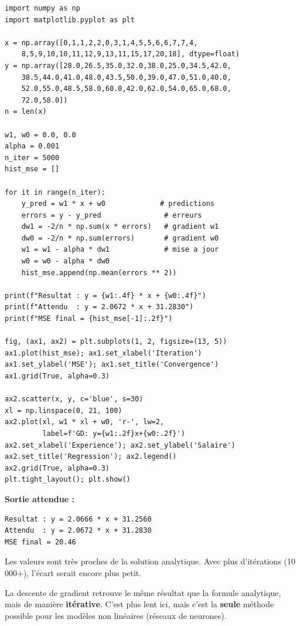 \begin{pythonbox}
\begin{lstlisting}
import numpy as np
import matplotlib.pyplot as plt

x = np.array([0,1,1,2,2,0,3,1,4,5,5,6,6,7,7,4,
    8,5,9,10,10,11,12,9,13,11,15,17,20,18], dtype=float)
y = np.array([28.0,26.5,35.0,32.0,38.0,25.0,34.5,42.0,
    38.5,44.0,41.0,48.0,43.5,50.0,39.0,47.0,51.0,40.0,
    52.0,55.0,48.5,58.0,60.0,42.0,62.0,54.0,65.0,68.0,
    72.0,58.0])
n = len(x)

w1, w0 = 0.0, 0.0
alpha = 0.001
n_iter = 5000
hist_mse = []

for it in range(n_iter):
    y_pred = w1 * x + w0             # predictions
    errors = y - y_pred               # erreurs
    dw1 = -2/n * np.sum(x * errors)   # gradient w1
    dw0 = -2/n * np.sum(errors)       # gradient w0
    w1 = w1 - alpha * dw1             # mise a jour
    w0 = w0 - alpha * dw0
    hist_mse.append(np.mean(errors ** 2))

print(f"Resultat : y = {w1:.4f} * x + {w0:.4f}")
print(f"Attendu  : y = 2.0672 * x + 31.2830")
print(f"MSE final = {hist_mse[-1]:.2f}")

fig, (ax1, ax2) = plt.subplots(1, 2, figsize=(13, 5))
ax1.plot(hist_mse); ax1.set_xlabel('Iteration')
ax1.set_ylabel('MSE'); ax1.set_title('Convergence')
ax1.grid(True, alpha=0.3)

ax2.scatter(x, y, c='blue', s=30)
xl = np.linspace(0, 21, 100)
ax2.plot(xl, w1 * xl + w0, 'r-', lw=2,
         label=f'GD: y={w1:.2f}x+{w0:.2f}')
ax2.set_xlabel('Experience'); ax2.set_ylabel('Salaire')
ax2.set_title('Regression'); ax2.legend()
ax2.grid(True, alpha=0.3)
plt.tight_layout(); plt.show()
\end{lstlisting}
\end{pythonbox}

\textbf{Sortie attendue :}
\begin{verbatim}
Resultat : y = 2.0666 * x + 31.2560
Attendu  : y = 2.0672 * x + 31.2830
MSE final = 20.46
\end{verbatim}

Les valeurs sont tr\`{e}s proches de la solution analytique. Avec plus d'it\'{e}rations (10\,000+), l'\'{e}cart serait encore plus petit.

\begin{retenirbox}
    La descente de gradient retrouve le m\^{e}me r\'{e}sultat que la formule analytique,
    mais de mani\`{e}re \textbf{it\'{e}rative}. C'est plus lent ici, mais c'est la \textbf{seule}
    m\'{e}thode possible pour les mod\`{e}les non lin\'{e}aires (r\'{e}seaux de neurones).
\end{retenirbox}

